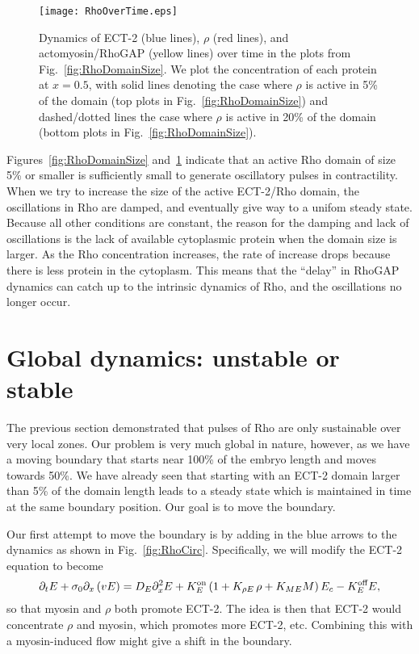 \documentclass[11pt]{article}
\begin{document}
\begin{figure}
\centering
\texttt{[image: RhoOverTime.eps]}
\caption{\label{fig:RhoTime} Dynamics of ECT-2 (blue lines), $\rho$ (red lines), and actomyosin/RhoGAP (yellow lines) over time in the plots from Fig.\ \ref{fig:RhoDomainSize}. We plot the concentration of each protein at $x=0.5$, with solid lines denoting the case where $\rho$ is active in 5\% of the domain (top plots in Fig.\ \ref{fig:RhoDomainSize}) and dashed/dotted lines the case where $\rho$ is active in 20\% of the domain (bottom plots in Fig.\ \ref{fig:RhoDomainSize}).}
\end{figure}

Figures\ \ref{fig:RhoDomainSize} and\ \ref{fig:RhoTime} indicate that an active Rho domain of size 5\% or smaller is sufficiently small to generate oscillatory pulses in contractility. When we try to increase the size of the active ECT-2/Rho domain, the oscillations in Rho are damped, and eventually give way to a unifom steady state. Because all other conditions are constant, the reason for the damping and lack of oscillations is the lack of available cytoplasmic protein when the domain size is larger. As the Rho concentration increases, the rate of increase drops because there is less protein in the cytoplasm. This means that the ``delay'' in RhoGAP dynamics can catch up to the intrinsic dynamics of Rho, and the oscillations no longer occur. 

\section{Global dynamics: unstable or stable}
The previous section demonstrated that pulses of Rho are only sustainable over very local zones. Our problem is very much global in nature, however, as we have a moving boundary that starts near 100\% of the embryo length and moves towards 50\%. We have already seen that starting with an ECT-2 domain larger than 5\% of the domain length leads to a steady state which is maintained in time at the same boundary position. Our goal is to move the boundary.

Our first attempt to move the boundary is by adding in the blue arrows to the dynamics as shown in Fig.\ \ref{fig:RhoCirc}. Specifically, we will modify the ECT-2 equation to become 
\begin{equation}
\partial_t E + \sigma_0 \partial_x \left( v E\right) = D_E \partial_x^2 E +K^\text{on}_E \left(1+K_{\rho E}\, \rho+K_{ME} M\right) E_c - K^\text{off}_E E,
\end{equation}
so that myosin and $\rho$ both promote ECT-2. The idea is then that ECT-2 would concentrate $\rho$ and myosin, which promotes more ECT-2, etc. Combining this with a myosin-induced flow might give a shift in the boundary.
\end{document}
